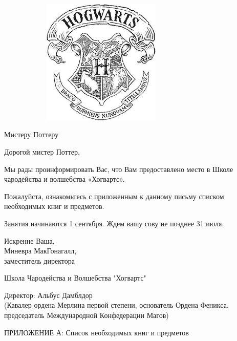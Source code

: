 \documentclass[14pt, a4paper]{article}
\begin{document}
	

	
\begin{center}
\includegraphics[height=6cm,width=10cm,keepaspectratio]{1.jpg}
\end{center}

\vspace{1cm}
{ \fontsize{12}{1}\selectfont Мистеру Поттеру}

\vspace{2.5cm}

Дорогой мистер Поттер,

Мы рады проинформировать Вас, что Вам предоставлено место в Школе чародейства и волшебства «Хогвартс».

Пожалуйста, ознакомьтесь с приложенным к данному письму списком необходимых книг и предметов.

Занятия начинаются 1 сентября. Ждем вашу сову не позднее 31 июля.

Искренне Ваша,\\
Миневра МакГонагалл,\\
заместитель директора

\vfill
\begin{center}
	Школа Чародейства и Волшебства "Хогвартс"
	
	{\fontsize{12}{1}\selectfont Директор: Альбус Дамблдор \\ 
	(Кавалер ордена Мерлина первой степени, основатель Ордена Феникса, председатель Международной Конфедерации Магов)}

	\end{center}


\newpage



{\fontsize{18}{1}\selectfont ПРИЛОЖЕНИЕ А: Список необходимых книг и предметов}	
\end{document}
